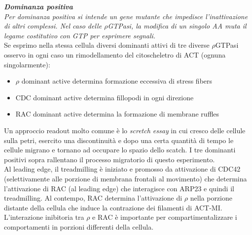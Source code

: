             \textit{    
                \textbf{Dominanza positiva} \\
                Per dominanza positiva si intende un gene mutante che impedisce l'inattivazione di altri complessi. Nel caso delle $\rho$GTPasi, la modifica di un singolo AA muta il legame costitutivo con GTP per esprimere segnali.}\\
            
            Se esprimo nella stessa cellula diversi dominanti attivi di tre diverse $\rho$GTPasi osservo in ogni caso un rimodellamento del citoscheletro di ACT (ognuna singolarmente):
            \begin{itemize}
                \item $\rho$ dominant active determina formazione eccessiva di stress fibers
                \item CDC dominant active determina fillopodi in ogni direzione
                \item RAC dominant active determina la formazione di membrane ruffles
            \end{itemize}
            Un approccio readout molto comune è lo \textit{scretch essay} in cui cresco delle cellule sulla petri, esercito una discontinuità e dopo una certa quantità di tempo le cellule migrano e tornano ad occupare lo spazio dello scatch. 
            I tre dominanti positivi sopra rallentano il processo migratorio di questo esperimento. \\
            Al leading edge, il treadmilling è iniziato e promosso da attivazione di CDC42 (selettivamente alle porzione di membrana frontali al movimento) che determina l'attivazione di RAC (al leading edge) che interagisce con ARP23 e quindi il treadmilling. Al contempo, RAC determina l'attivazione di $\rho$ nella porzione distante della cellula che induce la contrazione dei filamenti di ACT-MI.
            L'interazione inibitoria tra $\rho$ e RAC è importante per compartimentalizzare i comportamenti in porzioni differenti della cellula.

\pagebreak